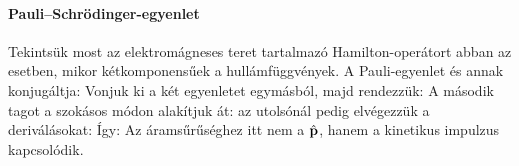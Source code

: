    \paragraph{Pauli--Schrödinger-egyenlet}
    
    Tekintsük most az elektromágneses teret tartalmazó Ha\-mil\-ton-o\-pe\-rá\-tort  abban az esetben, mikor kétkomponensűek a hullámfüggvények. A Pauli-egyenlet és annak konjugáltja:
    Vonjuk ki a két egyenletet egymásból, majd rendezzük:
    A második tagot a szokásos módon alakítjuk át:
    \eq{
     \Psi^\dagger\Delta\Psi-\Delta\Psi^\dagger\Psi=\divo{\big(\Psi^\dagger\grad\Psi-\grad\Psi^\dagger\Psi\big)},
    } 
    az utolsónál pedig elvégezzük a deriválásokat:
    Így:
    Az áramsűrűséghez itt nem a $\hat{\mathbf{p}}$, hanem a kinetikus impulzus kapcsolódik.
    
